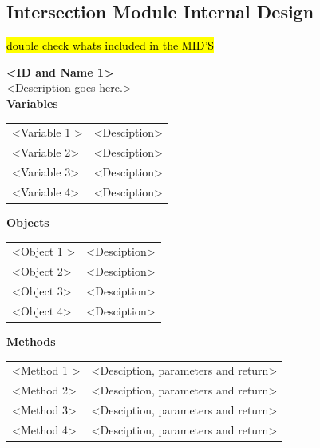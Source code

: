 \documentclass [10pt]{article}
\begin{document}
\subsection{Intersection Module Internal Design}

\begin{center}
    \hl {double check whats included in the MID'S}
\end{center}


\textbf{<ID and Name 1>} \\

<Description goes here.>  \\

\textbf{Variables} 

\begin{longtable}{ p{ }  p{ }} \\ 

 
\rowcolor{tableCell} <Variable 1 >& <Desciption> \\ 
<Variable 2>& <Desciption> \\

\rowcolor{tableCell}<Variable 3> & <Desciption> \\ 
<Variable 4>& <Desciption> \\

\end{longtable}

\textbf{Objects} 
\begin{longtable}{ p{ }  p{ }} \\ 

 
\rowcolor{tableCell} <Object 1 >& <Desciption> \\ 
<Object 2>& <Desciption> \\

\rowcolor{tableCell}<Object 3> & <Desciption> \\ 
<Object 4>& <Desciption> \\

\end{longtable}


\textbf{Methods} 
\begin{longtable}{ p{ }  p{ }} \\ 

 
\rowcolor{tableCell} <Method 1 >& <Desciption, parameters and return>\\ 
<Method 2>& <Desciption, parameters and return>\\

\rowcolor{tableCell}<Method 3> & <Desciption, parameters and return> \\ 
<Method 4>& <Desciption, parameters and return> \\

\end{longtable}
\end{document}
